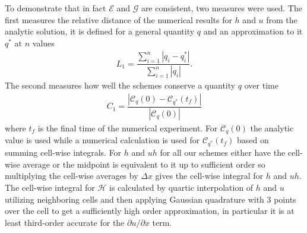 \documentclass[SingleSpace,12pt,Proceedings]{Serre_ASCE}
\begin{document}
To demonstrate that in fact $\mathcal{E}$ and $\mathcal{G}$ are consistent, two measures were used. The first measures the relative distance of the numerical results for $h$ and $u$ from the analytic solution, it is defined for a general quantity $q$ and an approximation to it $q^*$ at $n$ values
\begin{gather}
L_1 = \dfrac{\sum_{i = 1}^{n} \left| q_i - q^*_i\right|}{\sum_{i = 1}^{n} \left| q_i\right|}.
\end{gather}
The second measures how well the schemes conserve a quantity $q$ over time
\begin{gather}
C_1 = \dfrac{\left| \mathcal{C}_q(0) - \mathcal{C}_{q^*}(t_f) \right|}{\left| \mathcal{C}_q(0) \right|}
\end{gather}
where $t_f$ is the final time of the numerical experiment. For $\mathcal{C}_q(0)$ the analytic value is used while a numerical calculation is used for $\mathcal{C}_{q^*}(t_f)$ based on summing cell-wise integrals. For $h$ and $uh$ for all our schemes either have the cell-wise average or the midpoint is equivalent to it up to sufficient order so multiplying the cell-wise averages by $\Delta x$ gives the cell-wise integral for $h$ and $uh$. The cell-wise integral for $\mathcal{H}$ is calculated by quartic interpolation of $h$ and $u$ utilizing neighboring cells and then applying Gaussian quadrature with 3 points over the cell to get a sufficiently high order approximation, in particular it is at least third-order accurate for the $\partial u / \partial x$ term. 
%
\end{document}
